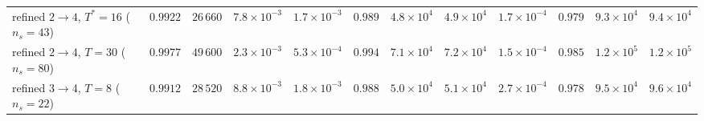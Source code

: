 \documentclass[
  aps,            %
  prc,            %
  reprint,        %
  superscriptaddress,
  floatfix,
  nofootinbib
]{revtex4-2}
\begin{document}
\begin{table}[t]
\begin{ruledtabular}
\begin{tabular}{lcc c cccc cccc}
refined $2\!\to\!4$, $T^{*}{=}16$ ($n_s{=}43$) & $0.9922$ & $26\,660$ & $7.8\times10^{-3}$ & $1.7\times10^{-3}$ & $0.989$ & $4.8\times10^{4}$ & $4.9\times10^{4}$ & $1.7\times10^{-4}$ & $0.979$ & $9.3\times10^{4}$ & $9.4\times10^{4}$\\
refined $2\!\to\!4$, $T{=}30$ ($n_s{=}80$) & $0.9977$ & $49\,600$ & $2.3\times10^{-3}$ & $5.3\times10^{-4}$ & $0.994$ & $7.1\times10^{4}$ & $7.2\times10^{4}$ & $1.5\times10^{-4}$ & $0.985$ & $1.2\times10^{5}$ & $1.2\times10^{5}$\\
refined $3\!\to\!4$, $T{=}8$ ($n_s{=}22$) & $0.9912$ & $28\,520$ & $8.8\times10^{-3}$ & $1.8\times10^{-3}$ & $0.988$ & $5.0\times10^{4}$ & $5.1\times10^{4}$ & $2.7\times10^{-4}$ & $0.978$ & $9.5\times10^{4}$ & $9.6\times10^{4}$\\
\end{tabular}
\end{ruledtabular}
\end{table}
\end{document}
